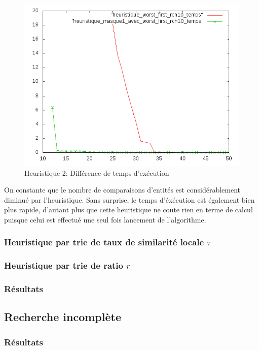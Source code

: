 \documentclass[a4paper,12pt]{article}
\begin{document}
\begin{figure}[H]
\begin{center}
\includegraphics[scale=0.6]{./graphique/diff2_temps.png}
\end{center}
\caption{Heuristique 2: Différence de temps d'exécution}
\end{figure}

On constante que le nombre de comparaisons d'entités est considérablement diminué par l'heuristique. Sans surprise, le temps d'éxécution est également bien plus rapide, d'autant plus que cette heuristique ne coute rien en terme de calcul puisque celui est effectué une seul fois lancement de l'algorithme.

\subsubsection{Heuristique par trie de taux de similarité locale $\tau$}
\subsubsection{Heuristique par trie de ratio $r$}

\subsubsection{Résultats}

\subsection{Recherche incomplète}
\subsubsection{Résultats}
\end{document}
